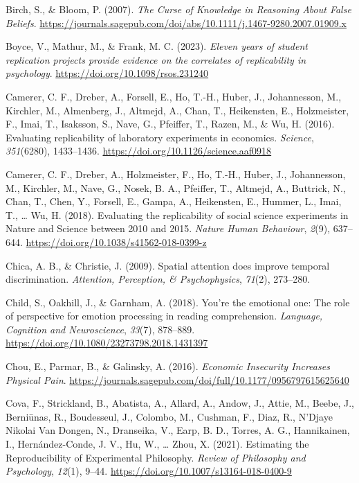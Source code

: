 \documentclass[
  english,
  a4paper,
]{article}
\newlength{\cslhangindent}
\newenvironment{CSLReferences}[2] %
{\begin{list}{}{%
			\setlength{\itemindent}{0pt}
			\setlength{\leftmargin}{0pt}
			\setlength{\parsep}{0pt}
			\ifodd #1
			\setlength{\leftmargin}{\cslhangindent}
			\setlength{\itemindent}{-1\cslhangindent}
			\fi
			\setlength{\itemsep}{#2\baselineskip}}}
	{\end{list}}
\begin{document}
\begin{CSLReferences}{1}{0}
Birch, S., \& Bloom, P. (2007). \emph{The {Curse} of {Knowledge} in {Reasoning About False Beliefs}}. \url{https://journals.sagepub.com/doi/abs/10.1111/j.1467-9280.2007.01909.x}

Boyce, V., Mathur, M., \& Frank, M. C. (2023). \emph{Eleven years of student replication projects provide evidence on the correlates of replicability in psychology}. \url{https://doi.org/10.1098/rsos.231240}

Camerer, C. F., Dreber, A., Forsell, E., Ho, T.-H., Huber, J., Johannesson, M., Kirchler, M., Almenberg, J., Altmejd, A., Chan, T., Heikensten, E., Holzmeister, F., Imai, T., Isaksson, S., Nave, G., Pfeiffer, T., Razen, M., \& Wu, H. (2016). Evaluating replicability of laboratory experiments in economics. \emph{Science}, \emph{351}(6280), 1433--1436. \url{https://doi.org/10.1126/science.aaf0918}

Camerer, C. F., Dreber, A., Holzmeister, F., Ho, T.-H., Huber, J., Johannesson, M., Kirchler, M., Nave, G., Nosek, B. A., Pfeiffer, T., Altmejd, A., Buttrick, N., Chan, T., Chen, Y., Forsell, E., Gampa, A., Heikensten, E., Hummer, L., Imai, T., \ldots{} Wu, H. (2018). Evaluating the replicability of social science experiments in {Nature} and {Science} between 2010 and 2015. \emph{Nature Human Behaviour}, \emph{2}(9), 637--644. \url{https://doi.org/10.1038/s41562-018-0399-z}

Chica, A. B., \& Christie, J. (2009). Spatial attention does improve temporal discrimination. \emph{Attention, Perception, \& Psychophysics}, \emph{71}(2), 273--280.

Child, S., Oakhill, J., \& Garnham, A. (2018). You're the emotional one: The role of perspective for emotion processing in reading comprehension. \emph{Language, Cognition and Neuroscience}, \emph{33}(7), 878--889. \url{https://doi.org/10.1080/23273798.2018.1431397}

Chou, E., Parmar, B., \& Galinsky, A. (2016). \emph{Economic {Insecurity Increases Physical Pain}}. \url{https://journals.sagepub.com/doi/full/10.1177/0956797615625640}

Cova, F., Strickland, B., Abatista, A., Allard, A., Andow, J., Attie, M., Beebe, J., Berniūnas, R., Boudesseul, J., Colombo, M., Cushman, F., Diaz, R., N'Djaye Nikolai Van Dongen, N., Dranseika, V., Earp, B. D., Torres, A. G., Hannikainen, I., Hernández-Conde, J. V., Hu, W., \ldots{} Zhou, X. (2021). Estimating the {Reproducibility} of {Experimental Philosophy}. \emph{Review of Philosophy and Psychology}, \emph{12}(1), 9--44. \url{https://doi.org/10.1007/s13164-018-0400-9}


\end{CSLReferences}
\end{document}
